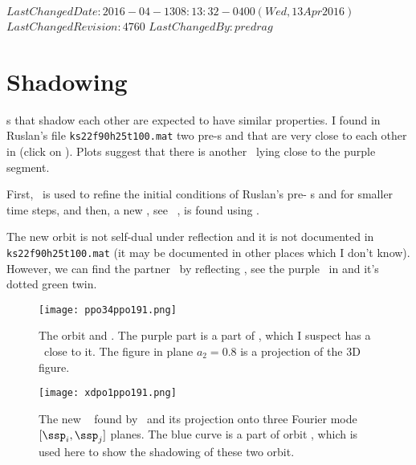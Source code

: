 \ifsvnmulti
 {$LastChangedDate: 2016-04-13 08:13:32 -0400 (Wed, 13 Apr 2016) $}
 {$LastChangedRevision: 4760 $} {$LastChangedBy: predrag $}
\fi



\section{Shadowing}
\label{sect:Shadowing}

\Po s that shadow each other are expected to have similar properties. I
found in Ruslan's file \texttt{ks22f90h25t100.mat} two pre-\po s
 and  that are very close to each other in
 (click on
).
Plots suggest that there is another \po\ lying close
to the purple segment.

First, \LMa\ is used to refine the initial conditions of Ruslan's pre-\po
s  and  for smaller time steps, and then, a
new \po, see \ , is found using \LMa.

The new orbit  is not self-dual under reflection and it is not documented in
\texttt{{ks22f90h25t100.mat}} (it may be documented in other places which I don't know).
However,
we can find the partner \po\ by reflecting , see
the purple \po\ in  and it's dotted green twin.
    \begin{figure}[h]
    \centering
	    \texttt{[image: ppo34ppo191.png]}
	    \caption{
The orbit  and . The purple part is a part of
, which I suspect has a \po\ close to it. The figure in
plane $a_{2}=0.8$ is  	a projection of the 3D figure.
	    }
	    \label{fig:ppo34ppo191}
    \end{figure}

    \begin{figure}[h]
    \centering
	    \texttt{[image: xdpo1ppo191.png]}
	    \caption{
The new \po\  found by \LMa\ and its projection onto three
Fourier mode $[\ssp_i,\ssp_j]$ planes. The blue curve is a part of orbit
, which is used here to show the shadowing of these two
orbit.
	    }
	    \label{fig:xdpo1ppo191}
    \end{figure}


